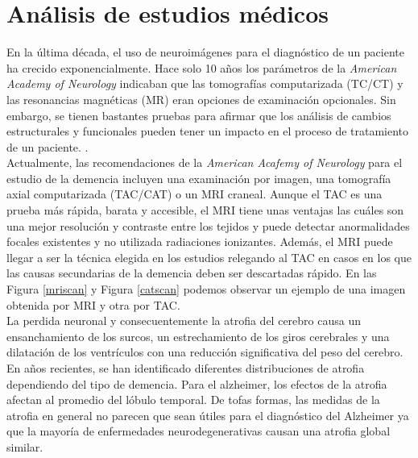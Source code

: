 
\section{Análisis de estudios médicos}

En la última década, el uso de neuroimágenes para el diagnóstico de un paciente ha crecido exponencialmente. Hace solo 10 años los parámetros de la \textit{American Academy of Neurology} indicaban que las tomografías computarizada (TC/CT) y las resonancias magnéticas (MR) eran opciones de examinación opcionales. Sin embargo, se tienen bastantes pruebas para afirmar que los análisis de cambios estructurales y funcionales pueden tener un impacto en el proceso de tratamiento de un paciente. \cite{SCHELTENS200213}.\\

Actualmente, las recomendaciones de la \textit{American Acafemy of Neurology} para el estudio de la demencia incluyen una examinación por imagen, una tomografía axial computarizada (TAC/CAT) o un MRI craneal. Aunque el TAC es una prueba más rápida, barata y accesible, el MRI tiene unas ventajas las cuáles son una mejor resolución y contraste entre los tejidos y puede detectar anormalidades focales existentes y no utilizada radiaciones ionizantes. Además, el MRI puede llegar a ser la técnica elegida en los estudios relegando al TAC en casos en los que las causas secundarias de la demencia deben ser descartadas rápido. En las Figura \ref{mriscan} y Figura \ref{catscan} podemos observar un ejemplo de una imagen obtenida por MRI y otra por TAC.\\

La perdida neuronal y consecuentemente la atrofia del cerebro causa un ensanchamiento de los surcos, un estrechamiento de los giros cerebrales y una dilatación de los ventrículos con una reducción significativa del peso del cerebro. En años recientes, se han identificado diferentes distribuciones de atrofia dependiendo del tipo de demencia. Para el alzheimer, los efectos de la atrofia afectan al promedio del lóbulo temporal. De tofas formas, las medidas de la atrofia en general no parecen que sean útiles para el diagnóstico del Alzheimer ya que la mayoría de enfermedades neurodegenerativas causan una atrofia global similar.

